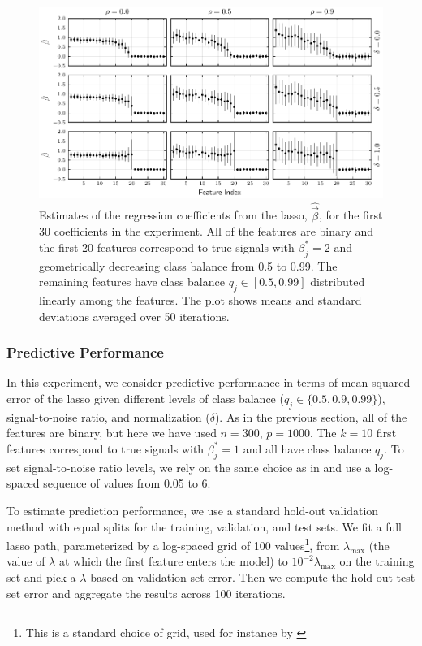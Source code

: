 \begin{figure}[htpb]
  \centering
  \includegraphics[]{plots/binary_decreasing.pdf}
  \caption{%
    Estimates of the regression coefficients from the lasso, \(\hat{\vec{\beta}}\), for the
    first 30 coefficients in the experiment. All of the features are binary and the first 20
    features correspond to true signals with \(\beta_j^* = 2\) and geometrically decreasing
    class balance from 0.5 to 0.99. The remaining features have class balance \(q_j \in [0.5,
      0.99]\) distributed linearly among the features. The plot shows means and standard
    deviations averaged over 50 iterations.} \label{fig:binary-decreasing}
\end{figure}

\subsubsection{Predictive Performance}\label{sec:predictive-performance}

In this experiment, we consider predictive performance in terms of mean-squared error of
the lasso given different levels of class balance (\(q_j \in \{0.5, 0.9, 0.99\}\)),
signal-to-noise ratio, and normalization (\(\delta\)). As in the previous section, all of
the features are binary, but here we have used \(n=300\), \(p = \num{1000}\). The \(k=10\)
first features correspond to true signals with \(\beta^*_j = 1\) and all have class balance
\(q_j\). To set signal-to-noise ratio levels, we rely on the same choice as in
\citet{hastie2020} and use a log-spaced sequence of values from 0.05 to 6.

To estimate prediction performance, we use a standard hold-out validation method with equal
splits for the training, validation, and test sets. We fit a full lasso path, parameterized
by a log-spaced grid of 100 values\footnote{This is a standard choice of grid, used for
  instance by \citet{friedman2010}}, from \(\lambda_\text{max}\) (the value of \(\lambda\) at
which the first feature enters the model) to \(10^{-2}\lambda_\text{max}\) on the training
set and pick a \(\lambda\) based on validation set error. Then we compute the hold-out test
set error and aggregate the results across 100 iterations.

